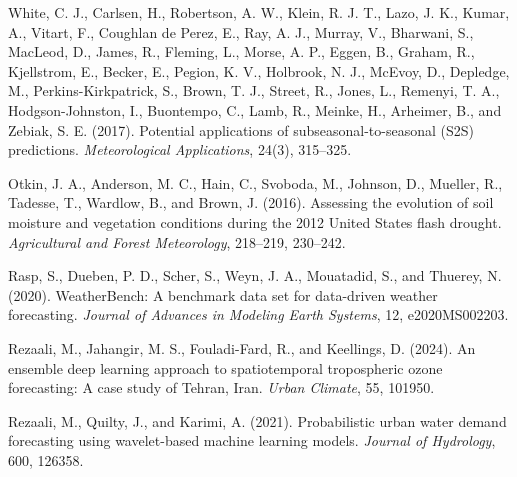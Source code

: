 \documentclass[11pt,letterpaper]{article}
\begin{document}
\noindent White, C. J., Carlsen, H., Robertson, A. W., Klein, R. J. T., Lazo, J. K., Kumar, A., Vitart, F., Coughlan de Perez, E., Ray, A. J., Murray, V., Bharwani, S., MacLeod, D., James, R., Fleming, L., Morse, A. P., Eggen, B., Graham, R., Kjellstrom, E., Becker, E., Pegion, K. V., Holbrook, N. J., McEvoy, D., Depledge, M., Perkins-Kirkpatrick, S., Brown, T. J., Street, R., Jones, L., Remenyi, T. A., Hodgson-Johnston, I., Buontempo, C., Lamb, R., Meinke, H., Arheimer, B., and Zebiak, S. E. (2017). Potential applications of subseasonal-to-seasonal (S2S) predictions. \textit{Meteorological Applications}, 24(3), 315--325.

\noindent Otkin, J. A., Anderson, M. C., Hain, C., Svoboda, M., Johnson, D., Mueller, R., Tadesse, T., Wardlow, B., and Brown, J. (2016). Assessing the evolution of soil moisture and vegetation conditions during the 2012 United States flash drought. \textit{Agricultural and Forest Meteorology}, 218--219, 230--242.

\noindent Rasp, S., Dueben, P. D., Scher, S., Weyn, J. A., Mouatadid, S., and Thuerey, N. (2020). WeatherBench: A benchmark data set for data-driven weather forecasting. \textit{Journal of Advances in Modeling Earth Systems}, 12, e2020MS002203.

\noindent Rezaali, M., Jahangir, M. S., Fouladi-Fard, R., and Keellings, D. (2024). An ensemble deep learning approach to spatiotemporal tropospheric ozone forecasting: A case study of Tehran, Iran. \textit{Urban Climate}, 55, 101950.

\noindent Rezaali, M., Quilty, J., and Karimi, A. (2021). Probabilistic urban water demand forecasting using wavelet-based machine learning models. \textit{Journal of Hydrology}, 600, 126358.
\end{document}
